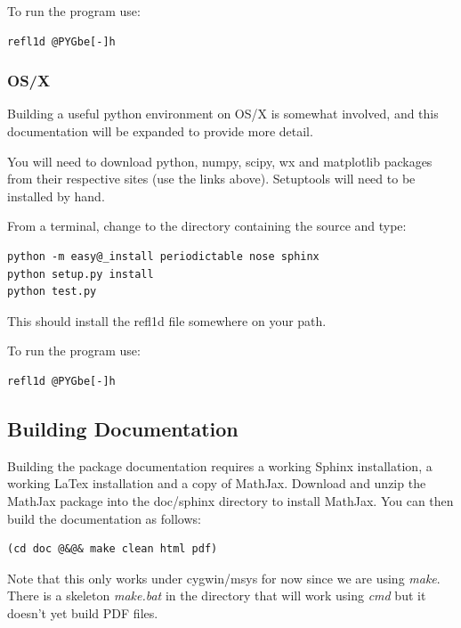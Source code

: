 \documentclass[letterpaper,10pt,english]{sphinxmanual}
\begin{document}
To run the program use:

\begin{Verbatim}[commandchars=@\[\]]
refl1d @PYGbe[-]h
\end{Verbatim}


\subsubsection{OS/X}
\label{getting_started/install:os-x}
Building a useful python environment on OS/X is somewhat involved, and
this documentation will be expanded to provide more detail.

You will need to download python, numpy, scipy, wx and matplotlib
packages from their respective sites (use the links above).  Setuptools
will need to be installed by hand.

From a terminal, change to the directory containing the source and type:

\begin{Verbatim}[commandchars=@\[\]]
python -m easy@_install periodictable nose sphinx
python setup.py install
python test.py
\end{Verbatim}

This should install the refl1d file somewhere on your path.

To run the program use:

\begin{Verbatim}[commandchars=@\[\]]
refl1d @PYGbe[-]h
\end{Verbatim}


\subsection{Building Documentation}
\label{getting_started/install:building-documentation}
Building the package documentation requires a working Sphinx installation,
a working LaTex installation and a copy of MathJax.  Download and unzip
the MathJax package into the doc/sphinx directory to install MathJax.  You
can then build the documentation as follows:

\begin{Verbatim}[commandchars=@\[\]]
(cd doc @&@& make clean html pdf)
\end{Verbatim}

Note that this only works under cygwin/msys for now since we are
using \emph{make}.  There is a skeleton \emph{make.bat} in the directory
that will work using \emph{cmd} but it doesn't yet build PDF files.
\end{document}

